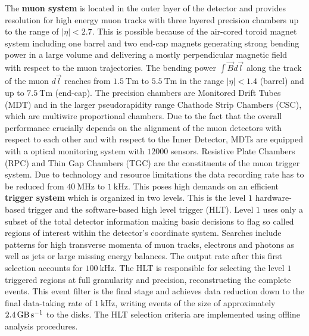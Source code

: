 The \textbf{muon system} is located in the outer layer of the {\ATLAS} detector and provides resolution for high energy muon tracks with three layered precision chambers up to the range of $|\eta|<2.7$. This is possible because of the air-cored toroid magnet system including one barrel and two end-cap magnets generating strong bending power in a large volume and delivering  a mostly perpendicular magnetic field with respect to the muon trajectories. The bending power $\int{\vec{B}d\vec{l}}$ along the track of the muon $d\vec{l}$ reaches from $\SI{1.5}{\tesla\meter}$ to $\SI{5.5}{\tesla\meter}$ in the range $|\eta|<1.4$ (barrel) and up to $\SI{7.5}{\tesla\meter}$ (end-cap). The precision chambers are Monitored Drift Tubes (MDT) and in the larger pseudorapidity range Chathode Strip Chambers (CSC), which are multiwire proportional chambers. Due to the fact that the overall performance crucially depends on the alignment of the muon detectors with respect to each other and with respect to the Inner Detector, MDTs are equipped with a optical monitoring system with $12000$ sensors. Resistive Plate Chambers (RPC) and Thin Gap Chambers (TGC) are the constituents of the muon trigger system. \cite{ATLASJINST} \newline %
Due to technology and resource limitations the data recording rate has to be reduced from $\SI{40}{\mega\hertz}$ to $\SI{1}{\kilo\hertz}$. This poses high demands on an efficient \textbf{trigger system} which is organized in two levels. This is the level $1$ hardware-based trigger and the software-based high level trigger (HLT). Level $1$ uses only a subset of the total detector information making basic decisions to flag so called regions of interest within the detector's coordinate system. Searches include patterns for high transverse momenta of muon tracks, electrons and photons as well as jets or large missing energy balances. The output rate after this first selection accounts for $\SI{100}{\kilo\hertz}$. The HLT is responsible for selecting the level $1$ triggered regions at full granularity and precision, reconstructing the complete events. This event filter is the final stage and achieves data reduction down to the final data-taking rate of $\SI{1}{\kilo\hertz}$, writing events of the size of approximately $\SI{2.4}{\giga\byte\per\second}$ to the disks. The HLT selection criteria are implemented using offline analysis procedures. \cite{ATLASJINST}\cite{newATLASJINST} %
